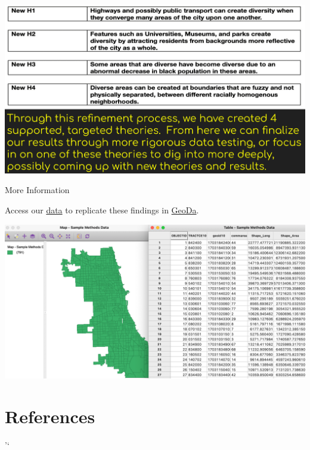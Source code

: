 \documentclass[
]{book}
\begin{document}
\includegraphics{images/racialdiversity5.png}

More Information

Access our \href{https://uchicago.box.com/s/5rmjez5pxh7odornc9xzmg3x0wmqkmjg}{data} to replicate these findings in \href{https://geodacenter.github.io}{GeoDa}.

\includegraphics{images/racialdiversity6.png}

\hypertarget{references}{%
\chapter*{References}\label{references}}

'`

  
\end{document}
